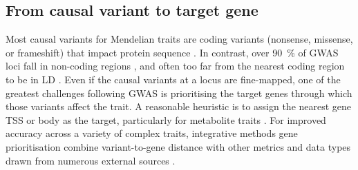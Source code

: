 \begin{outline}
%
%
%
%

\subsection{From causal variant to target gene}

Most causal variants for Mendelian traits are coding variants (nonsense, missense, or frameshift) that impact protein sequence \autocite{chong2015GeneticBasisMendelian}.
In contrast, over \SI{90}{\percent} of \gls{GWAS} loci fall in non-coding regions \autocite{gallagher2018PostGWASEraAssociation},
and often too far from the nearest coding region to be in \gls{LD} \autocite{brodie2016HowFarSNP}.
Even if the causal variants at a locus are fine-mapped, 
one of the greatest challenges following \gls{GWAS} is prioritising the target genes through which those variants affect the trait.
A reasonable heuristic is to assign the nearest gene \gls{TSS} or body as the target, particularly for metabolite traits \autocite{stacey2019ProGeMFrameworkPrioritization}.
For improved accuracy across a variety of complex traits,
integrative methods gene prioritisation combine variant-to-gene distance with other metrics and data types drawn from numerous external sources \autocite{stacey2019ProGeMFrameworkPrioritization,forgetta2020EffectorIndexPredict,ghoussaini2020OpenTargetsGenetics}.


\end{outline}
